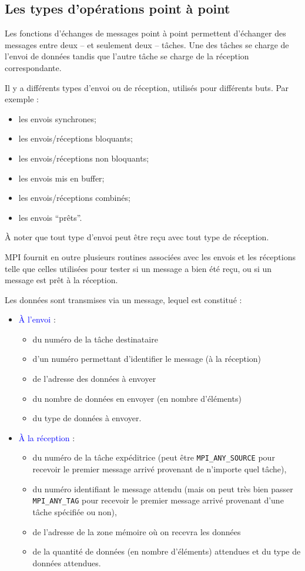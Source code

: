 \documentclass[11pt,a4paper]{article}
\begin{document}
\subsection{Les types d'opérations point à point}

Les fonctions d'échanges de messages point à point permettent d'échanger des messages
entre deux -- et seulement deux -- tâches. Une des tâches se charge de l'envoi de données
tandis que l'autre tâche se charge de la réception correspondante.

Il y a différents types d'envoi ou de réception, utilisés pour différents buts. Par exemple :
\begin{itemize}
\item les envois synchrones;
\item les envois/réceptions bloquants;
\item les envois/réceptions non bloquants;
\item les envois mis en buffer;
\item les envois/réceptions combinés;
\item les envois ``prêts''.
\end{itemize}

\`A noter que tout type d'envoi peut être reçu avec tout type de réception.

MPI fournit en outre plusieurs routines associées avec les envois et les réceptions telle que celles utilisées
pour tester si un message a bien été reçu, ou si un message est prêt à la réception.

Les données sont transmises via un message, lequel est constitué :
\begin{itemize}
\item \textcolor{blue}{\`A l'envoi} : 
  \begin{itemize}
  \item du numéro de la tâche destinataire
  \item d'un numéro permettant d'identifier le message (à la réception)
  \item de l'adresse des données à envoyer
  \item du nombre de données en envoyer (en nombre d'éléments)
  \item du type de données à envoyer.
  \end{itemize}
\item \textcolor{blue}{\`A la réception} : 
\begin{itemize}
\item du numéro de la tâche expéditrice (peut être \texttt{MPI\_ANY\_SOURCE} pour recevoir le premier message arrivé provenant de n'importe quel tâche), 
\item du numéro identifiant le message attendu (mais on peut très bien passer \texttt{MPI\_ANY\_TAG} pour recevoir le premier message arrivé provenant d'une tâche spécifiée ou non), 
\item de l'adresse de la zone mémoire où on recevra les données
\item de la quantité de données (en nombre d'éléments)
attendues et du type de données attendues.
\end{itemize}
\end{itemize}
\end{document}

